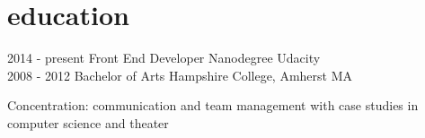 \documentclass[]{friggeri-cv} %
\begin{document}
\section{education}

\begin{entrylist}
\entry
{2014 - present}
{Front End Developer Nanodegree}{}
{Udacity}
\\
\entry
{2008 - 2012}
{Bachelor of Arts}{}
{Hampshire College, Amherst MA}

\entry
{\mediumitalic Concentration:}
{\normalfont communication and team management with case studies in computer science and theater}{}{}
\end{entrylist}
\end{document}
